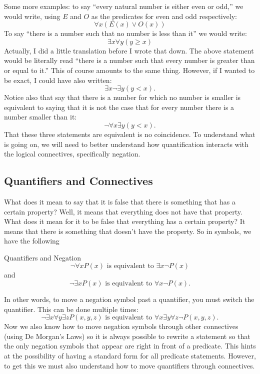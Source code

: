 \documentclass[12pt]{article}
\begin{document}
Some more examples: to say ``every natural number is either even or odd,'' we would write, using $E$ and $O$ as the predicates for even and odd respectively:
\[\forall x (E(x) \vee O(x))\]
To say ``there is a number such that no number is less than it'' we would write:
\[ \exists x \forall y (y \ge x)\]
Actually, I did a little translation before I wrote that down.  The above statement would be literally read ``there is a number such that every number is greater than or equal to it.''  This of course amounts to the same thing.  However, if I wanted to be exact, I could have also written:
\[ \exists x \neg \exists y (y < x).\]
Notice also that say that there is a number for which no number is smaller is equivalent to saying that it is not the case that for every number there is a number smaller than it:
\[\neg \forall x \exists y (y < x).\]
That these three statements are equivalent is no coincidence.  To understand what is going on, we will need to better understand how quantification interacts with the logical connectives, specifically negation.

\subsection{Quantifiers and Connectives}

What does it mean to say that it is false that there is something that has a certain property?  Well, it means that everything does not have that property.  What does it mean for it to be false that everything has a certain property?  It means that there is something that doesn't have the property.  So in symbols, we have the following

\begin{defbox}{Quantifiers and Negation}
\[\neg \forall x P(x) \mbox{ is equivalent to } \exists x \neg P(x)\]
and
\[\neg \exists x P(x)\mbox{ is equivalent to } \forall x \neg P(x).\]
\end{defbox}

In other words, to move a negation symbol past a quantifier, you must switch the quantifier. This can be done multiple times:
\[\neg \exists x \forall y \exists z P(x,y,z) \mbox{ is equivalent to } \forall x \exists y \forall z \neg P(x,y,z).\]
Now we also know how to move negation symbols through other connectives (using De Morgan's Laws) so it is always possible to rewrite a statement so that the only negation symbols that appear are right in front of a predicate.  This hints at the possibility of having a standard form for all predicate statements.  However, to get this we must also understand how to move quantifiers through connectives.
\end{document}
